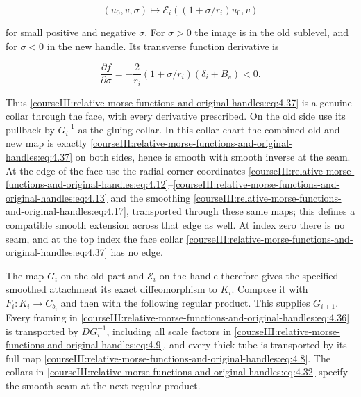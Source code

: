 \begin{equation}
(u_0,v,\sigma)\longmapsto
\mathcal E_i((1+\sigma/r_i)u_0,v)
\label{courseIII:relative-morse-functions-and-original-handles:eq:4.37}
\end{equation}

for small positive and negative \(\sigma\). For \(\sigma>0\) the image is in the old sublevel, and for \(\sigma<0\) in the new handle. Its transverse function derivative is

\begin{equation}
\frac{\partial f}{\partial\sigma}
=-\frac{2}{r_i}(1+\sigma/r_i)(\delta_i+B_v)<0.
\label{courseIII:relative-morse-functions-and-original-handles:eq:4.38}
\end{equation}

Thus \eqref{courseIII:relative-morse-functions-and-original-handles:eq:4.37} is a genuine collar through the face, with every derivative prescribed. On the old side use its pullback by \(G_i^{-1}\) as the gluing collar. In this collar chart the combined old and new map is exactly \eqref{courseIII:relative-morse-functions-and-original-handles:eq:4.37} on both sides, hence is smooth with smooth inverse at the seam. At the edge of the face use the radial corner coordinates \eqref{courseIII:relative-morse-functions-and-original-handles:eq:4.12}--\eqref{courseIII:relative-morse-functions-and-original-handles:eq:4.13} and the smoothing \eqref{courseIII:relative-morse-functions-and-original-handles:eq:4.17}, transported through these same maps; this defines a compatible smooth extension across that edge as well. At index zero there is no seam, and at the top index the face collar \eqref{courseIII:relative-morse-functions-and-original-handles:eq:4.37} has no edge.

The map \(G_i\) on the old part and \(\mathcal E_i\) on the handle therefore gives the specified smoothed attachment its exact diffeomorphism to \(K_i\). Compose it with \(F_i:K_i\to C_{b_i}\) and then with the following regular product. This supplies \(G_{i+1}\). Every framing in \eqref{courseIII:relative-morse-functions-and-original-handles:eq:4.36} is transported by \(DG_i^{-1}\), including all scale factors in \eqref{courseIII:relative-morse-functions-and-original-handles:eq:4.9}, and every thick tube is transported by its full map \eqref{courseIII:relative-morse-functions-and-original-handles:eq:4.8}. The collars in \eqref{courseIII:relative-morse-functions-and-original-handles:eq:4.32} specify the smooth seam at the next regular product.

